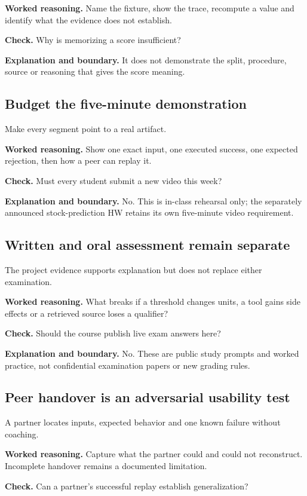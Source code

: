 \textbf{Worked reasoning.} Name the fixture, show the trace, recompute a value and identify what the evidence does not establish.

\textbf{Check.} Why is memorizing a score insufficient?

\textbf{Explanation and boundary.} It does not demonstrate the split, procedure, source or reasoning that gives the score meaning.

\subsection{Budget the five-minute demonstration}
Make every segment point to a real artifact.

\textbf{Worked reasoning.} Show one exact input, one executed success, one expected rejection, then how a peer can replay it.

\textbf{Check.} Must every student submit a new video this week?

\textbf{Explanation and boundary.} No. This is in-class rehearsal only; the separately announced stock-prediction HW retains its own five-minute video requirement.

\subsection{Written and oral assessment remain separate}
The project evidence supports explanation but does not replace either examination.

\textbf{Worked reasoning.} What breaks if a threshold changes units, a tool gains side effects or a retrieved source loses a qualifier?

\textbf{Check.} Should the course publish live exam answers here?

\textbf{Explanation and boundary.} No. These are public study prompts and worked practice, not confidential examination papers or new grading rules.

\subsection{Peer handover is an adversarial usability test}
A partner locates inputs, expected behavior and one known failure without coaching.

\textbf{Worked reasoning.} Capture what the partner could and could not reconstruct. Incomplete handover remains a documented limitation.

\textbf{Check.} Can a partner's successful replay establish generalization?


